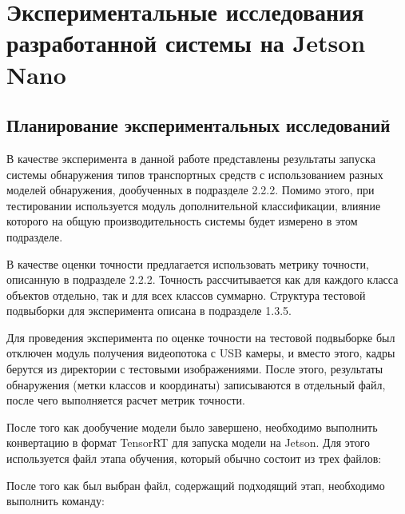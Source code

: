 \chapter{Экспериментальные исследования разработанной системы на Jetson Nano}

\section{Планирование экспериментальных исследований}

В качестве эксперимента в данной работе представлены результаты запуска системы обнаружения типов транспортных средств с использованием разных моделей обнаружения, дообученных в подразделе 2.2.2. Помимо этого, при тестировании используется модуль дополнительной классификации, влияние которого на общую производительность системы будет измерено в этом подразделе.

В качестве оценки точности предлагается использовать метрику точности, описанную в подразделе 2.2.2. Точность рассчитывается как для каждого класса объектов отдельно, так и для всех классов суммарно. Структура тестовой подвыборки для эксперимента описана в подразделе 1.3.5.

Для проведения эксперимента по оценке точности на тестовой подвыборке был отключен модуль получения видеопотока с USB камеры, и вместо этого, кадры берутся из директории с тестовыми изображениями. После этого, результаты обнаружения (метки классов и координаты) записываются в отдельный файл, после чего выполняется расчет метрик точности.

После того как дообучение модели было завершено, необходимо выполнить конвертацию в формат TensorRT для запуска модели на Jetson. Для этого используется файл этапа обучения, который обычно состоит из трех файлов:


После того как был выбран файл, содержащий подходящий этап, необходимо выполнить команду:

